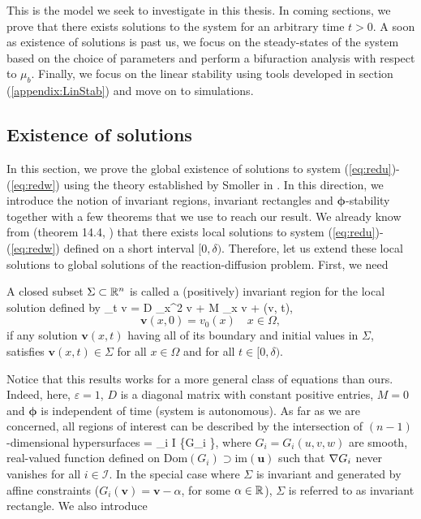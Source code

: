 This is the model we seek to investigate in this thesis. In coming sections, we prove that there exists solutions to the system for an arbitrary time $t>0$. A soon as existence of solutions is past us, we focus on the steady-states of the system based on the choice of parameters and perform a bifuraction analysis with respect to $\mu_b$. Finally, we focus on the linear stability using tools developed in section (\ref{appendix:LinStab}) and move on to simulations.

\subsection{Existence of solutions}


In this section, we prove the global existence of solutions to system (\ref{eq:redu})-(\ref{eq:redw}) using the theory established by Smoller in \cite{Smoller1994}. In this direction, we introduce the notion of invariant regions, invariant rectangles and $\bm\phi$-stability together with a few theorems that we use to reach our result. We already know from (theorem 14.4, \cite{Smoller1994}) that there exists local solutions to system (\ref{eq:redu})-(\ref{eq:redw}) defined on a short interval $[0, \delta)$. Therefore, let us extend these local solutions to global solutions of the reaction-diffusion problem. First, we need

\begin{definition}
	A closed subset $\Sigma \subset \mathbb{R}^n$ is called a (positively) invariant region for the local solution defined by 
	\be\label{eq:smoller_sys}\del_t \bm v = \varepsilon D \del_x^2 \bm v + M \del_x v + \bm \phi(v, t),\ee
	$$\bm v(x, 0) = v_0(x) \quad x\in\Omega,$$ 
	if any solution $\bm v(x, t)$ having all of its boundary and initial values in $\Sigma$, satisfies $\bm v(x, t) \in \Sigma$ for all $x\in\Omega$ and for all $t \in [0, \delta)$.
\end{definition}  

Notice that this results works for a more general class of equations than ours. Indeed, here, $\varepsilon = 1$, $D$ is a diagonal matrix with constant positive entries, $M=0$ and $\bm \phi$ is independent of time (system is autonomous). As far as we are concerned, all regions of interest can be described by the intersection of $(n-1)$-dimensional hypersurfaces 
\be\label{eq:sigma}\Sigma = \bigcap_{i \in \mathcal I} \{G_i  \},\ee
 where $G_i = G_i(u, v, w)$ are smooth, real-valued function defined on $\mathrm{Dom}(G_i) \supset \mathrm{im}(\bm u)$ such that $\nabla G_i$ never vanishes for all $i \in \mathcal I$. In the special case where $\Sigma$ is invariant and generated by affine constraints ($G_i(\bm v) = \bm v - \alpha$, for some $\alpha \in \mathbb{R}$), $\Sigma$ is referred to as invariant rectangle. We also introduce

